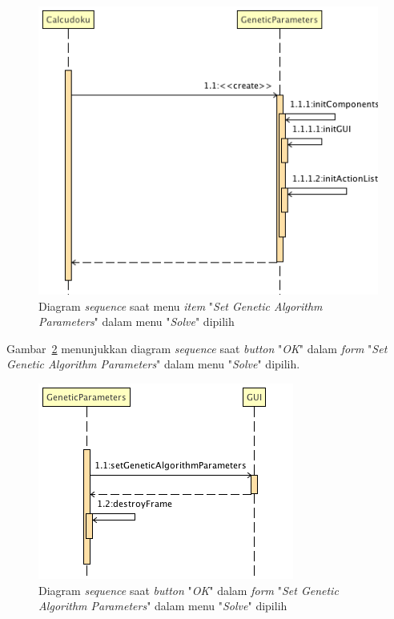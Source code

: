 \begin{figure}
\centering
\captionsetup{justification=centering}
\includegraphics[scale=0.5]{Gambar/Analisis/SequenceDiagramGeneticParameters.png}
\caption[Diagram \textit{sequence} saat menu \textit{item}" \textit{Set Genetic Algorithm Parameters}" dalam menu "\textit{Solve}" dipilih]{Diagram \textit{sequence} saat menu \textit{item} "\textit{Set Genetic Algorithm Parameters}" dalam menu "\textit{Solve}" dipilih}
\label{fig:sequencegaparameters}
\end{figure}

Gambar~\ref{fig:sequencegaparametersok} menunjukkan diagram \textit{sequence} saat \textit{button} "\textit{OK}" dalam \textit{form} "\textit{Set Genetic Algorithm Parameters}" dalam menu "\textit{Solve}" dipilih.

\begin{figure}
\centering
\captionsetup{justification=centering}
\includegraphics[scale=0.5]{Gambar/Analisis/SequenceDiagramGeneticParametersOK.png}
\caption[Diagram \textit{sequence} saat \textit{button} "\textit{OK}" dalam \textit{form} "\textit{Set Genetic Algorithm Parameters}" dalam menu "\textit{Solve}" dipilih]{Diagram \textit{sequence} saat \textit{button} "\textit{OK}" dalam \textit{form} "\textit{Set Genetic Algorithm Parameters}" dalam menu "\textit{Solve}" dipilih}
\label{fig:sequencegaparametersok}
\end{figure}

